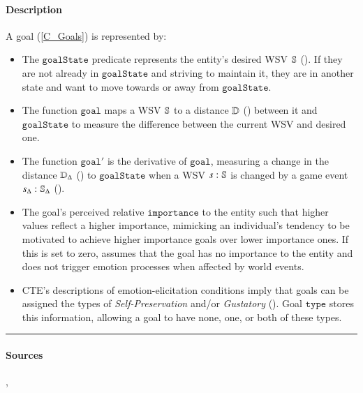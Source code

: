 \paragraph{Description} A goal (\cref{C_Goals}) is represented by:
\begin{itemize}

    \item The $\mathtt{goalState}$ predicate represents the entity's desired
    WSV $\mathbb{S}$ (). If they are not already in
    $\mathtt{goalState}$ and striving to maintain it, they are in another state
    and want to move towards or away from $\mathtt{goalState}$.

    \item The function $\mathtt{goal}$ maps a WSV $\mathbb{S}$ to a
    distance $\mathbb{D}$ ()
    between it and $\mathtt{goalState}$ to measure the difference between the
    current WSV and desired one.

    \item The function $\mathtt{goal'}$ is the derivative of $\mathtt{goal}$,
    measuring a change in the distance $\mathbb{D}_{\Delta}$
    () to $\mathtt{goalState}$ when
    a WSV $s: \mathbb{S}$ is changed by a game event $s_{\Delta} :
    \mathbb{S}_{\Delta}$ ().

    \item The goal's perceived relative $\mathtt{importance}$ to the entity
    such that higher values reflect a higher importance, mimicking an
    individual's tendency to be motivated to achieve higher importance goals
    over lower importance ones. If this is set to zero, \progname{} assumes
    that the goal has no importance to the entity and does not trigger emotion
    processes when affected by world events.

    \item CTE's descriptions of emotion-elicitation conditions imply that goals
    can be assigned the types of \textit{Self-Preservation} and/or
    \textit{Gustatory} (). Goal $\mathtt{type}$
    stores this information, allowing a goal to have none, one, or both of
    these types.

\end{itemize}
\hrule

\paragraph{Sources} \citet[p.~361]{broekens2021emotion},
\citet[p.~204]{izard1977human}

